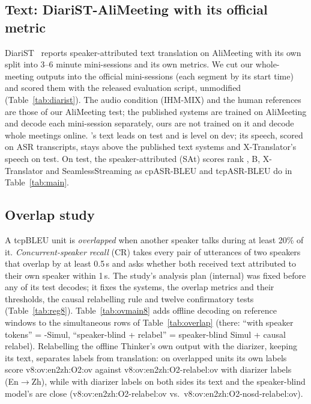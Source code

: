 \subsection{Text: DiariST-AliMeeting with its official metric}
\label{app:diarist}
DiariST~\citep{yang2024diarist} reports speaker-attributed text translation on AliMeeting with its own split into 3--6
minute mini-sessions and its own metrics. We cut our whole-meeting outputs into the official mini-sessions (each
segment by its start time) and scored them with the released evaluation script, unmodified (Table~\ref{tab:diarist}).
The audio condition (IHM-MIX) and the human references are those of our AliMeeting test; the published systems are
trained on AliMeeting and decode each mini-session separately, ours are not trained on it and decode whole meetings
online. \sys{}'s text leads on test and is level on dev; its speech, scored on ASR transcripts, stays above the
published text systems and X-Translator's speech on test. On test, the speaker-attributed (SAt) scores rank \sys{}, B,
X-Translator and SeamlessStreaming as cpASR-BLEU and tcpASR-BLEU do in Table~\ref{tab:main}.


\subsection{Overlap study}
\label{app:v8}
\label{sec:eval-overlap}
A tcpBLEU unit is \emph{overlapped} when another speaker talks during at least 20\% of it. \emph{Concurrent-speaker
recall} (CR) takes every pair of utterances of two speakers that overlap by at least 0.5\,s and asks whether both
received text attributed to their own speaker within 1\,s. The study's analysis plan (internal) was fixed before any of
its test decodes; it fixes the systems, the overlap metrics and their thresholds, the causal relabelling rule and twelve
confirmatory tests (Table~\ref{tab:reg8}). Table~\ref{tab:ovmain8} adds offline decoding on reference windows to the
simultaneous rows of Table~\ref{tab:overlap} (there: ``with speaker tokens'' = \sys{}-Simul, ``speaker-blind +
relabel'' = speaker-blind Simul + causal relabel). Relabelling the offline Thinker's own output with the diarizer,
keeping its text, separates labels from translation: on overlapped units its own labels score
\num{v8:ov:en2zh:O2:ov} against \num{v8:ov:en2zh:O2-relabel:ov} with diarizer labels (En$\rightarrow$Zh), while with
diarizer labels on both sides its text and the speaker-blind model's are close
(\num{v8:ov:en2zh:O2-relabel:ov} vs.\ \num{v8:ov:en2zh:O2-nosd-relabel:ov}).



